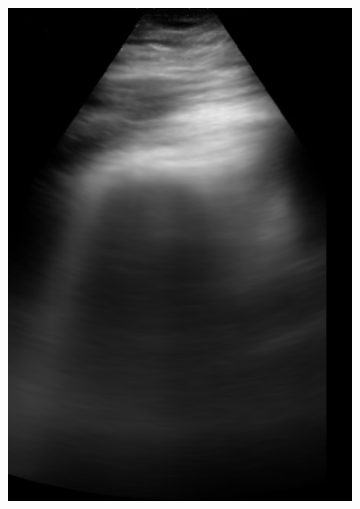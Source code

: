 \documentclass[11pt]{article} %
\begin{document}
\begin{figure}
\begin{subfigure}{0.3\textwidth}
		\includegraphics[width=\textwidth]{figuras/centroid_1.jpg}
		\end{subfigure}
		\begin{subfigure}{0.3\textwidth}
		\centering

\end{subfigure}
\end{figure}
\end{document}
